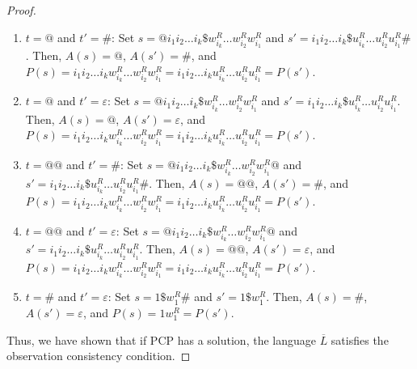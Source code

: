 \documentclass[preprint,1p,times]{elsarticle}
\newcommand{\eps}{\varepsilon}
\begin{document}
\begin{proof}
\begin{enumerate}
      \item $t=@$ and $t'=\#$: Set $s=@i_1i_2\ldots i_k\$w_{i_k}^R\ldots w_{i_2}^Rw_{i_1}^R$ and $s'=i_1i_2\ldots i_k\$u_{i_k}^R\ldots u_{i_2}^Ru_{i_1}^R\#$. Then, $A(s)=@$, $A(s')=\#$, and $P(s)=i_1i_2\ldots i_kw_{i_k}^R\ldots w_{i_2}^Rw_{i_1}^R=i_1i_2\ldots i_ku_{i_k}^R\ldots u_{i_2}^Ru_{i_1}^R=P(s')$.
      
      \item $t=@$ and $t'=\eps$: Set $s=@i_1i_2\ldots i_k\$w_{i_k}^R\ldots w_{i_2}^Rw_{i_1}^R$ and $s'=i_1i_2\ldots i_k\$u_{i_k}^R\ldots u_{i_2}^Ru_{i_1}^R$. Then, $A(s)=@$, $A(s')=\eps$, and $P(s)=i_1i_2\ldots i_kw_{i_k}^R\ldots w_{i_2}^Rw_{i_1}^R=i_1i_2\ldots i_ku_{i_k}^R\ldots u_{i_2}^Ru_{i_1}^R=P(s')$.
      
      \item $t=@@$ and $t'=\#$: Set $s=@i_1i_2\ldots i_k\$w_{i_k}^R\ldots w_{i_2}^Rw_{i_1}^R@$ and $s'=i_1i_2\ldots i_k\$u_{i_k}^R\ldots u_{i_2}^Ru_{i_1}^R\#$. Then, $A(s)=@@$, $A(s')=\#$, and $P(s)=i_1i_2\ldots i_kw_{i_k}^R\ldots w_{i_2}^Rw_{i_1}^R=i_1i_2\ldots i_ku_{i_k}^R\ldots u_{i_2}^Ru_{i_1}^R=P(s')$.
      
      \item $t=@@$ and $t'=\eps$: Set $s=@i_1i_2\ldots i_k\$w_{i_k}^R\ldots w_{i_2}^Rw_{i_1}^R@$ and $s'=i_1i_2\ldots i_k\$u_{i_k}^R\ldots u_{i_2}^Ru_{i_1}^R$. Then, $A(s)=@@$, $A(s')=\eps$, and $P(s)=i_1i_2\ldots i_kw_{i_k}^R\ldots w_{i_2}^Rw_{i_1}^R=i_1i_2\ldots i_ku_{i_k}^R\ldots u_{i_2}^Ru_{i_1}^R=P(s')$.
      
      \item $t=\#$ and $t'=\eps$: Set $s=1\$w_1^R\#$ and $s'=1\$w_1^R$. Then, $A(s)=\#$, $A(s')=\eps$, and $P(s)=1w_1^R=P(s')$.
    \end{enumerate}
    Thus, we have shown that if PCP has a solution, the language $\overline{L}$ satisfies the observation consistency condition.
    

\end{proof}
\end{document}
